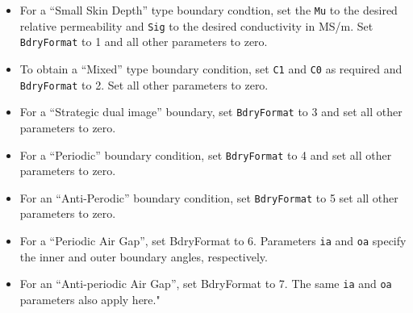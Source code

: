 \begin{itemize}
\begin{itemize}
        \item For a ``Small Skin Depth'' type boundary condtion, set the {\tt Mu}
        to the desired relative permeability and {\tt Sig} to the desired
        conductivity in MS/m.  Set {\tt BdryFormat} to 1 and all other
        parameters to zero.

        \item To obtain a ``Mixed'' type boundary condition, set {\tt C1} and
        {\tt C0} as required and {\tt BdryFormat} to 2.  Set all other
        parameters to zero.

        \item For a ``Strategic dual image'' boundary, set {\tt BdryFormat} to 3
        and set all other parameters to zero.

        \item For a ``Periodic'' boundary condition, set {\tt BdryFormat} to 4 and
        set all other parameters to zero.

        \item For an ``Anti-Perodic'' boundary condition, set {\tt BdryFormat} to
        5 set all other parameters to zero.
        
        \item  For a ``Periodic Air Gap'', set BdryFormat to 6. Parameters {\tt ia} and {\tt oa} specify the inner and outer  boundary angles, respectively.

        \item  For an ``Anti-periodic Air Gap'', set BdryFormat to 7.  The same  {\tt ia} and {\tt oa} parameters also apply here."

        \end{itemize}


\end{itemize}
